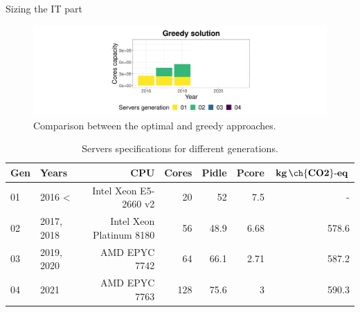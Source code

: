 \documentclass[Ligatures=TeX,table,svgnames,usetotalslideindicator,compress,10pt,aspectratio=169]{beamer}
\begin{document}
\begin{frame}{Sizing the IT part}
  \begin{center}
    \begin{figure}[h]    
      \centering
      \includegraphics[width=.9\textwidth]{images/cloud_federation_evolution_lifetime_year3.png}
      \caption{Comparison between the optimal and greedy approaches.}
    \end{figure}    
  \end{center}  

  \begin{table}[h]
  \tiny
  \label{tab:servers_specs} 
  \caption{Servers specifications for different generations.} \centering
  \begin{tabular}{|l|l|r|r|r|r|r|}
  \hline    
  \textbf{Gen} & \textbf{Years} & \textbf{CPU} &   \textbf{Cores} & \textbf{Pidle}  & \textbf{Pcore}  & \textbf{$\mathbf{kg\,\ch{CO2}\text{-}eq}$}  \\
  \hline
  01      &  2016 < & Intel Xeon E5-2660 v2 & 20 & 52 & 7.5  & -   \\
  \hline
  02 & 2017, 2018 & Intel Xeon Platinum 8180 & 56 & 48.9 & 6.68  & 578.6   \\
  \hline
  03   & 2019, 2020 & AMD EPYC 7742  & 64 & 66.1 & 2.71  & 587.2 \\
  \hline
  04   & 2021      & AMD EPYC 7763 & 128 & 75.6 & 3     & 590.3 \\
  \hline
  
\end{tabular}  
\end{table}

\end{frame}
\addtocounter{framenumber}{-1}
\end{document}

